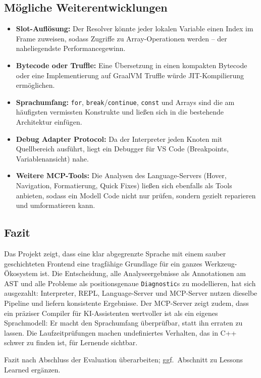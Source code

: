 \documentclass[11pt,a4paper,parskip=half,headsepline,toc=flat]{scrartcl}
\newcommand{\code}[1]{\texttt{#1}}
\begin{document}
\subsection{Mögliche Weiterentwicklungen}
\begin{itemize}
  \item \textbf{Slot-Auflösung:} Der Resolver könnte jeder lokalen Variable einen Index im Frame zuweisen, sodass
    Zugriffe zu Array-Operationen werden -- der naheliegendste Performancegewinn.
  \item \textbf{Bytecode oder Truffle:} Eine Übersetzung in einen kompakten Bytecode oder eine Implementierung auf
    GraalVM Truffle würde JIT-Kompilierung ermöglichen.
  \item \textbf{Sprachumfang:} \code{for}, \code{break}/\code{continue}, \code{const} und Arrays sind die am
    häufigsten vermissten Konstrukte und ließen sich in die bestehende Architektur einfügen.
  \item \textbf{Debug Adapter Protocol:} Da der Interpreter jeden Knoten mit Quellbereich ausführt, liegt ein
    Debugger für VS Code (Breakpoints, Variablenansicht) nahe.
  \item \textbf{Weitere MCP-Tools:} Die Analysen des Language-Servers (Hover, Navigation, Formatierung, Quick Fixes)
    ließen sich ebenfalls als Tools anbieten, sodass ein Modell Code nicht nur prüfen, sondern gezielt reparieren
    und umformatieren kann.
\end{itemize}

\subsection{Fazit}
Das Projekt zeigt, dass eine klar abgegrenzte Sprache mit einem sauber geschichteten Frontend eine tragfähige
Grundlage für ein ganzes Werkzeug-Ökosystem ist. Die Entscheidung, alle Analyseergebnisse als Annotationen am AST und
alle Probleme als positionsgenaue \code{Diagnostic}s zu modellieren, hat sich ausgezahlt: Interpreter, REPL,
Language-Server und MCP-Server nutzen dieselbe Pipeline und liefern konsistente Ergebnisse. Der MCP-Server zeigt
zudem, dass ein präziser Compiler für KI-Assistenten wertvoller ist als ein eigenes Sprachmodell: Er macht den
Sprachumfang überprüfbar, statt ihn erraten zu lassen. Die Laufzeitprüfungen machen undefiniertes Verhalten, das in
C++ schwer zu finden ist, für Lernende sichtbar.

\begin{todo}
Fazit nach Abschluss der Evaluation überarbeiten; ggf.\ Abschnitt zu Lessons Learned ergänzen.
\end{todo}
\end{document}
